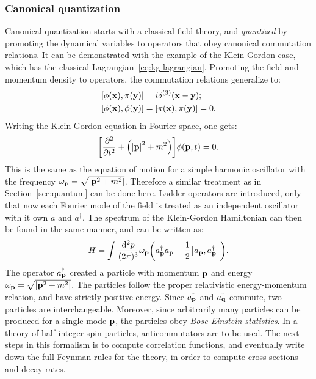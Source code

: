 \subsubsection{Canonical quantization}
\label{sec:canonical}

Canonical quantization starts with a classical field theory, and \emph{quantized} by promoting the dynamical variables to operators that obey canonical commutation relations. It can be demonstrated with the example of the Klein-Gordon case, which has the classical Lagrangian~\ref{eq:kg-lagrangian}. Promoting the field and momentum density to operators, the commutation relations generalize to:
\begin{equation}
\begin{split}
\comm{\phi\qty(\vb{x})}{\pi\qty(\vb{y})}&=i\delta^{(3)}\qty(\vb{x}-\vb{y});\\
\comm{\phi\qty(\vb{x})}{\phi\qty(\vb{y})}&=\comm{\pi\qty(\vb{x})}{\pi\qty(\vb{y})}=0.
\end{split}
\end{equation}
Writing the Klein-Gordon equation in Fourier space, one gets:
\begin{equation}
\qty[\pdv[2]{t} + \qty(\abs{\vb{p}}^2+m^2)]\phi(\vb{p},t)=0.
\end{equation}
This is the same as the equation of motion for a simple harmonic oscillator with the frequency $\omega_{\vb{p}}=\sqrt{\abs{\vb{p}^2+m^2}}$. Therefore a similar treatment as in  Section~\ref{sec:quantum} can be done here. Ladder operators are introduced, only that now each Fourier mode of the field is treated as an independent oscillator with it own $a$ and $a^\dagger$. The spectrum of the Klein-Gordon Hamiltonian can then be found in the same manner, and can be written as:
\begin{equation}
H=\int \frac{\dd^2 p}{(2\pi)^3} \omega_{\vb{p}}\qty(a^\dagger_{\vb{p}}a_{\vb{p}}+\frac{1}{2}\comm{a_{\vb{p}}}{a^\dagger_{\vb{p}}}).
\end{equation}
The operator $a^\dagger_{\vb{p}}$ created a particle with momentum $\vb{p}$ and energy $\omega_{\vb{p}}=\sqrt{\abs{\vb{p}^2+m^2}}$. The particles follow the proper relativistic energy-momentum relation, and have strictly positive energy. Since $a^\dagger_{\vb{p}}$ and $a^\dagger_{\vb{q}}$ commute, two particles are interchangeable. Moreover, since arbitrarily many particles can be produced for a single mode $\vb{p}$, the particles obey \emph{Bose-Einstein statistics}. In a theory of half-integer spin particles, anticommutators are to be used. The next steps in this formalism is to compute correlation functions, and eventually write down the full Feynman rules for the theory, in order to compute cross sections and decay rates.


